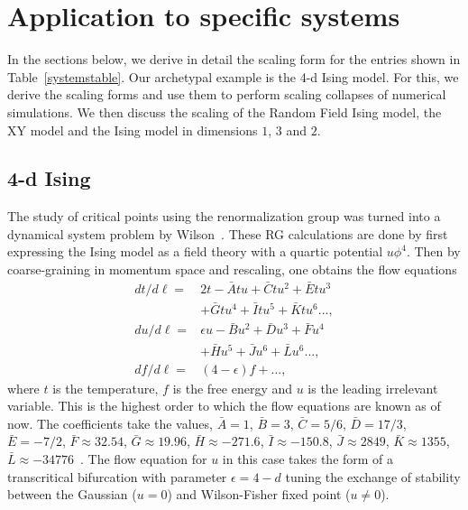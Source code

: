 \documentclass[
 reprint,
 amsmath,amssymb,
 aps, superscriptaddress, pre
]{revtex4-1}
\begin{document}
\section{Application to specific systems}
In the sections below, we derive in detail the scaling form for the entries shown in Table~\ref{systemstable}. Our archetypal example is the 4-d Ising model. For this, we derive the scaling forms and use them to perform scaling collapses of numerical simulations. We then discuss the scaling of the Random Field Ising model, the XY model and the Ising model in dimensions $1$, $3$ and $2$. 

\subsection{4-d Ising} \label{sec:4dising}

The study of critical points using the renormalization group was turned into a dynamical system problem by Wilson~\cite{wilson1974renormalization}. These RG calculations are done by first expressing the Ising model as a field theory with a quartic potential $u \phi^4$. Then by coarse-graining in momentum space and rescaling, one obtains the flow equations
\begin{align}
 {d t}/{d \ell} =& 2 t -  \bar{A} t u + \bar{C} t u^2 + \bar{E} t u^3 \nonumber \\ &+ \bar{G} t u^4 + \bar{I} t u^5 + \bar{K} t u^6 ... , \\
 {d u}/{d \ell} =& \epsilon u - \bar{B} u^2 + \bar{D} u^3 + \bar{F} u^4 \nonumber \\ &+ \bar{H} u^5 + \bar{J} u^6 + \bar{L} u^6  ... , \\
 {d f}/{d \ell} =& (4 - \epsilon) f + ...,
 \label{wilsoneqs}
\end{align}
where $t$ is the temperature, $f$ is the free energy and $u$ is the leading irrelevant variable. This is the highest order to which the flow equations are known as of now. The coefficients take the values, $\bar{A} = 1$, $\bar{B} = 3$, $\bar{C} = 5/6$, $\bar{D} = 17/3$, $\bar{E} = -7/2$, $\bar{F} \approx 32.54$, $\bar{G} \approx 19.96$, $\bar{H} \approx -271.6$, $\bar{I} \approx -150.8$, $\bar{J} \approx 2849$, $\bar{K} \approx 1355$, $\bar{L} \approx -34776$~\cite{kompaniets2016renormalization, chetyrkin1983five}. The flow equation for $u$ in this case takes the form of a transcritical bifurcation with parameter $\epsilon = 4 - d$ tuning the exchange of stability between the Gaussian ($u = 0$) and Wilson-Fisher fixed point ($u \neq 0$). 
\end{document}
